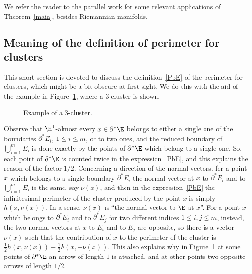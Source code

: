 We refer the reader to the parallel work \cite[]{FPS1} for some relevant applications of Theorem~\ref{main}, besides Riemannian manifolds.

\subsection{Meaning of the definition of perimeter for clusters\label{sec:defper}}

This short section is devoted to discuss the definition~\eqref{PbE} of the perimeter for clusters, which might be a bit obscure at first sight. We do this with the aid of the example in Figure~\ref{Figcluster}, where a $3$-cluster is shown.
\begin{figure}[htbp]
\vspace*{-3pt}
\caption{Example of a $3$-cluster.}\label{Figcluster}
\end{figure}
Observe that $\H^1$-almost every $x\in \partial^*\E$ belongs to either a single one of the boundaries $\partial^* E_i$, $1\leq i\leq m$, or to two ones, and the reduced boundary of $\bigcup_{i=1}^m E_i$ is done exactly by the points of $\partial^*\E$ which belong to a single one. So, each point of $\partial^* \E$ is counted twice in the expression~\eqref{PbE}, and this explains the reason of the factor $1/2$. Concerning a direction of the normal vectors, for a point $x$ which belongs to a single boundary $\partial^* E_i$ the normal vector at $x$ to $\partial^* E_i$ and to $\bigcup_{i=1}^m E_i$ is the same, say $\nu(x)$, and then in the expression~\eqref{PbE} the infinitesimal perimeter of the cluster produced by the point $x$ is simply $h(x,\nu(x))$. In a sense, $\nu(x)$ is ``the normal vector to $\E$ at $x$''. For a point $x$ which belongs to $\partial^* E_i$ and to $\partial^* E_j$ for two different indices $1\leq i,j\leq m$, instead, the two normal vectors at $x$ to $E_i$ and to $E_j$ are opposite, so there is a vector $\nu(x)$ such that the contribution of $x$ to the perimeter of the cluster is $\frac 12 h(x,\nu(x))+ \frac 12 h(x,-\nu(x))$. This also explains why in Figure~\ref{Figcluster} at some points of $\partial^*\E$ an arrow of length $1$ is attached, and at other points two opposite arrows of length $1/2$.

